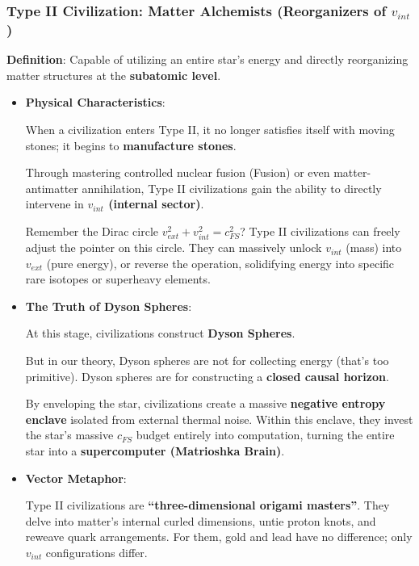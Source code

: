 \subsubsection{Type II Civilization: Matter Alchemists (Reorganizers of $v_{int}$)}

\textbf{Definition}: Capable of utilizing an entire star's energy and directly reorganizing matter structures at the \textbf{subatomic level}.

\begin{itemize}
\item \textbf{Physical Characteristics}:

    When a civilization enters Type II, it no longer satisfies itself with moving stones; it begins to \textbf{manufacture stones}.

    Through mastering controlled nuclear fusion (Fusion) or even matter-antimatter annihilation, Type II civilizations gain the ability to directly intervene in \textbf{$v_{int}$ (internal sector)}.

    Remember the Dirac circle $v_{ext}^2 + v_{int}^2 = c_{FS}^2$? Type II civilizations can freely adjust the pointer on this circle. They can massively unlock $v_{int}$ (mass) into $v_{ext}$ (pure energy), or reverse the operation, solidifying energy into specific rare isotopes or superheavy elements.

\item \textbf{The Truth of Dyson Spheres}:

    At this stage, civilizations construct \textbf{Dyson Spheres}.

    But in our theory, Dyson spheres are not for collecting energy (that's too primitive). Dyson spheres are for constructing a \textbf{closed causal horizon}.

    By enveloping the star, civilizations create a massive \textbf{negative entropy enclave} isolated from external thermal noise. Within this enclave, they invest the star's massive $c_{FS}$ budget entirely into computation, turning the entire star into a \textbf{supercomputer (Matrioshka Brain)}.

\item \textbf{Vector Metaphor}:

    Type II civilizations are \textbf{``three-dimensional origami masters''}. They delve into matter's internal curled dimensions, untie proton knots, and reweave quark arrangements. For them, gold and lead have no difference; only $v_{int}$ configurations differ.
\end{itemize}

